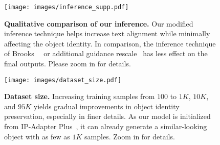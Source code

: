 \begin{table}[!t]
\centering
\setlength{\tabcolsep}{5pt}
\vspace{-8pt}
\caption{ \textbf{Our inference}. We compare our inference technique with vanilla image and text guidance technique~\cite{brooks2023instructpix2pix} as well as guidance rescale~\cite{lin2024common} with the same inference hyperparameters across all. 
}

\label{tbl:inference_supp}
\vspace{-12pt}
\end{table}


\begin{figure}[!t]
    \centering
    \texttt{[image: images/inference\_supp.pdf]}
    \vspace{-20pt}
    \caption{{\textbf{Qualitative comparison of our inference.} Our modified inference technique helps increase text alignment while minimally affecting the object identity. In comparison, the inference technique of Brooks~\etal~\cite{brooks2023instructpix2pix} or additional guidance rescale~\cite{lin2024common} has less effect on the final outputs. Please zoom in for details.
    }}
\end{figure}





\begin{figure}[t]
    \centering
    \texttt{[image: images/dataset\_size.pdf]}
    \vspace{-15pt}
    \caption{{\textbf{Dataset size.} Increasing training samples from $100$ to $1K$, $10K$, and $95K$ yields gradual improvements in object identity preservation, especially in finer details. As our model is initialized from IP-Adapter Plus~\cite{ye2023ip}, it can already generate a similar-looking object with as few as $1K$ samples. Zoom in for details.
    }}
\end{figure}

